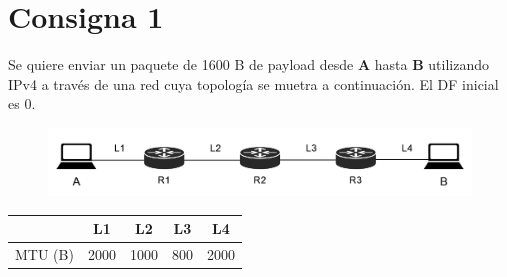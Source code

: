 \section*{Consigna 1}

Se quiere enviar un paquete de 1600 B de payload desde \textbf{A} hasta \textbf{B} utilizando IPv4 a través de una red cuya topología se muetra a continuación. El DF inicial es 0.

\begin{figure}[H]
    \centering
    \includegraphics[width=0.9\linewidth]{Images/topologia.png}
\end{figure}

\vspace{-5mm}
{
\renewcommand{\arraystretch}{1.5}
\begin{table}[H]
    \centering
    \begin{tabular}{|c|c|c|c|c|}
    \hline
     & L1 & L2 & L3 & L4 \\ \hline
    MTU (B) & 2000 & 1000 & 800 & 2000\\ \hline
    \end{tabular}
\end{table}
}


